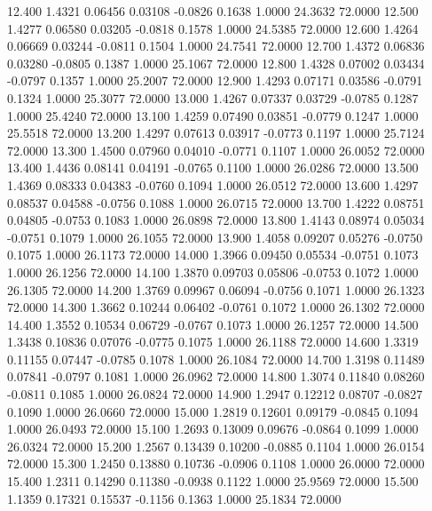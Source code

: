   12.400   1.4321   0.06456   0.03108  -0.0826   0.1638   1.0000  24.3632  72.0000
  12.500   1.4277   0.06580   0.03205  -0.0818   0.1578   1.0000  24.5385  72.0000
  12.600   1.4264   0.06669   0.03244  -0.0811   0.1504   1.0000  24.7541  72.0000
  12.700   1.4372   0.06836   0.03280  -0.0805   0.1387   1.0000  25.1067  72.0000
  12.800   1.4328   0.07002   0.03434  -0.0797   0.1357   1.0000  25.2007  72.0000
  12.900   1.4293   0.07171   0.03586  -0.0791   0.1324   1.0000  25.3077  72.0000
  13.000   1.4267   0.07337   0.03729  -0.0785   0.1287   1.0000  25.4240  72.0000
  13.100   1.4259   0.07490   0.03851  -0.0779   0.1247   1.0000  25.5518  72.0000
  13.200   1.4297   0.07613   0.03917  -0.0773   0.1197   1.0000  25.7124  72.0000
  13.300   1.4500   0.07960   0.04010  -0.0771   0.1107   1.0000  26.0052  72.0000
  13.400   1.4436   0.08141   0.04191  -0.0765   0.1100   1.0000  26.0286  72.0000
  13.500   1.4369   0.08333   0.04383  -0.0760   0.1094   1.0000  26.0512  72.0000
  13.600   1.4297   0.08537   0.04588  -0.0756   0.1088   1.0000  26.0715  72.0000
  13.700   1.4222   0.08751   0.04805  -0.0753   0.1083   1.0000  26.0898  72.0000
  13.800   1.4143   0.08974   0.05034  -0.0751   0.1079   1.0000  26.1055  72.0000
  13.900   1.4058   0.09207   0.05276  -0.0750   0.1075   1.0000  26.1173  72.0000
  14.000   1.3966   0.09450   0.05534  -0.0751   0.1073   1.0000  26.1256  72.0000
  14.100   1.3870   0.09703   0.05806  -0.0753   0.1072   1.0000  26.1305  72.0000
  14.200   1.3769   0.09967   0.06094  -0.0756   0.1071   1.0000  26.1323  72.0000
  14.300   1.3662   0.10244   0.06402  -0.0761   0.1072   1.0000  26.1302  72.0000
  14.400   1.3552   0.10534   0.06729  -0.0767   0.1073   1.0000  26.1257  72.0000
  14.500   1.3438   0.10836   0.07076  -0.0775   0.1075   1.0000  26.1188  72.0000
  14.600   1.3319   0.11155   0.07447  -0.0785   0.1078   1.0000  26.1084  72.0000
  14.700   1.3198   0.11489   0.07841  -0.0797   0.1081   1.0000  26.0962  72.0000
  14.800   1.3074   0.11840   0.08260  -0.0811   0.1085   1.0000  26.0824  72.0000
  14.900   1.2947   0.12212   0.08707  -0.0827   0.1090   1.0000  26.0660  72.0000
  15.000   1.2819   0.12601   0.09179  -0.0845   0.1094   1.0000  26.0493  72.0000
  15.100   1.2693   0.13009   0.09676  -0.0864   0.1099   1.0000  26.0324  72.0000
  15.200   1.2567   0.13439   0.10200  -0.0885   0.1104   1.0000  26.0154  72.0000
  15.300   1.2450   0.13880   0.10736  -0.0906   0.1108   1.0000  26.0000  72.0000
  15.400   1.2311   0.14290   0.11380  -0.0938   0.1122   1.0000  25.9569  72.0000
  15.500   1.1359   0.17321   0.15537  -0.1156   0.1363   1.0000  25.1834  72.0000
